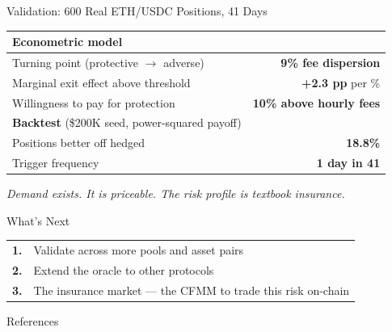 \documentclass[aspectratio=169]{beamer}
\begin{document}
\begin{frame}{Validation: 600 Real ETH/USDC Positions, 41 Days}

\renewcommand{\arraystretch}{1.5}
\begin{center}
\small
\begin{tabular}{@{}l r@{}}
\toprule
\textbf{Econometric model} & \\
\midrule
Turning point (protective $\to$ adverse) & \textbf{9\% fee dispersion} \\
Marginal exit effect above threshold & \textbf{+2.3 pp} per \% \\
Willingness to pay for protection & \textbf{10\% above hourly fees} \\
\midrule
\textbf{Backtest} (\$200K seed, power-squared payoff) & \\
\midrule
Positions better off hedged & \textbf{18.8\%} \\
Trigger frequency & \textbf{1 day in 41} \\
\bottomrule
\end{tabular}
\end{center}

\medskip

\begin{center}
\textit{Demand exists. It is priceable. The risk profile is textbook insurance.}
\end{center}

\end{frame}

\begin{frame}{What's Next}

\vfill

\renewcommand{\arraystretch}{2.0}
\begin{tabular}{@{}cl@{}}
\textbf{1.} & Validate across more pools and asset pairs \\
\textbf{2.} & Extend the oracle to other protocols \\
\textbf{3.} & The insurance market --- the CFMM to trade this risk on-chain \\
\end{tabular}

\vfill

\end{frame}

\begin{frame}[allowframebreaks]{References}
\footnotesize

\end{frame}
\end{document}
